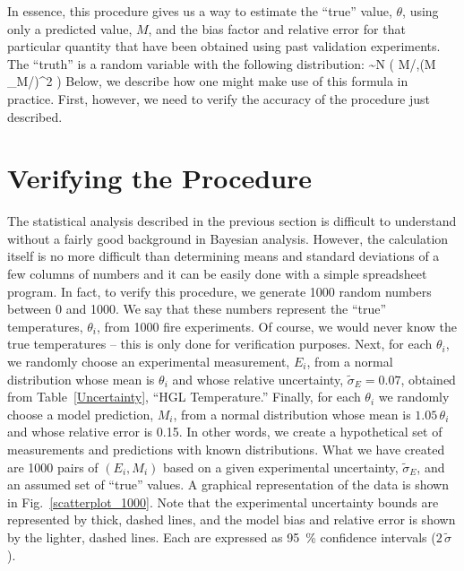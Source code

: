 In essence, this procedure gives us a way to estimate the ``true'' value, $\theta$, using only a predicted value, $M$, and the bias factor and relative error
for that particular quantity that have been obtained using past validation experiments. The ``truth'' is a random variable with the following distribution:
\be \theta \sim N \left( M/\delta,(M \, \widetilde{\sigma}_M/\delta)^2 \right) \label{truth} \ee
Below, we describe how one might make use of this formula in practice. First, however, we need to verify the accuracy of the procedure just described.

\section{Verifying the Procedure}

The statistical analysis described in the previous section is difficult to understand without a fairly good background in Bayesian analysis.
However, the calculation itself is no more difficult than determining means and standard deviations of a few columns of numbers and it can be easily
done with a simple spreadsheet program.
In fact, to verify this procedure, we generate 1000 random numbers between 0 and 1000. We say that these numbers represent the ``true'' temperatures, $\theta_i$, from 1000 fire
experiments. Of course, we would never know the true temperatures -- this is only done for verification purposes. Next, for each $\theta_i$, we randomly choose an
experimental measurement, $E_i$, from a normal distribution whose mean is $\theta_i$ and whose relative uncertainty, $\widetilde{\sigma}_E=0.07$, obtained from Table~\ref{Uncertainty},
``HGL Temperature.'' Finally, for each $\theta_i$ we randomly choose a model prediction, $M_i$, from a normal distribution whose mean is $1.05 \, \theta_i$
and whose relative error is 0.15. In other words, we create a hypothetical set of measurements and predictions with known distributions.
What we have created are 1000 pairs of $(E_i,M_i)$ based on a given experimental uncertainty, $\widetilde{\sigma}_E$, and an assumed set of ``true'' values. A graphical
representation of the data is shown in Fig.~\ref{scatterplot_1000}. Note that the experimental uncertainty bounds are represented by thick, dashed lines, and the model
bias and relative error is shown by the lighter, dashed lines. Each are expressed as 95~\% confidence intervals ($2 \, \widetilde{\sigma}$).


